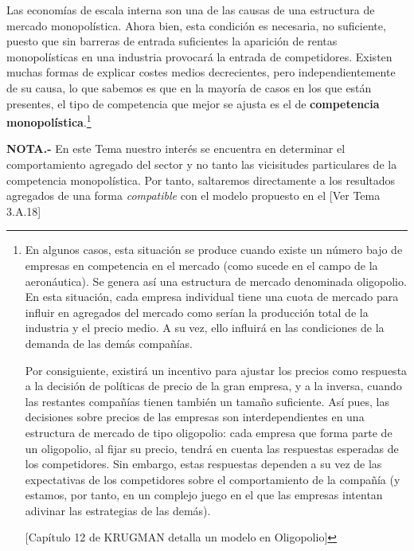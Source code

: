 \documentclass[10pt,a4paper]{article}
\newcommand{\authorfont}[1]{{\fontfamily{EBGaramond-TLF}\selectfont #1}}
\begin{document}
Las economías de escala interna son una de las causas de una estructura de mercado monopolística. Ahora bien, esta condición es necesaria, no suficiente, puesto que sin barreras de entrada suficientes la aparición de rentas monopolísticas en una industria provocará la entrada de competidores. Existen muchas formas de explicar costes medios decrecientes, pero independientemente de su causa, lo que sabemos es que en la mayoría de casos en los que están presentes, el tipo de competencia que mejor se ajusta es el de \textbf{competencia monopolística}.\footnote{%
    En algunos casos, esta situación se produce cuando existe un número bajo de empresas en competencia en el mercado (como sucede en el campo de la aeronáutica). Se genera así una estructura de mercado denominada oligopolio. En esta situación, cada empresa individual tiene una cuota de mercado para influir en agregados del mercado como serían la producción total de la industria y el precio medio. A su vez, ello influirá en las condiciones de la demanda de las demás compañías. 

Por consiguiente, existirá un incentivo para ajustar los precios como respuesta a la decisión de políticas de precio de la gran empresa, y a la inversa, cuando las restantes compañías tienen también un tamaño suficiente. Así pues, las decisiones sobre precios de las empresas son interdependientes en una estructura de mercado de tipo oligopolio: cada empresa que forma parte de un oligopolio, al fijar su precio, tendrá en cuenta las respuestas esperadas de los competidores. Sin embargo, estas respuestas dependen a su vez de las expectativas de los competidores sobre el comportamiento de la compañía (y estamos, por tanto, en un complejo juego en el que las empresas intentan adivinar las estrategias de las demás). 

[Capítulo 12 de KRUGMAN detalla un modelo en Oligopolio]
}

\textbf{NOTA.-} En este Tema nuestro interés se encuentra en determinar el comportamiento agregado del sector y no tanto las vicisitudes particulares de la competencia monopolística. Por tanto, saltaremos directamente a los resultados agregados de una forma \textit{compatible} con el modelo propuesto en el [\authorfont{Ver Tema 3.A.18}]
\end{document}
